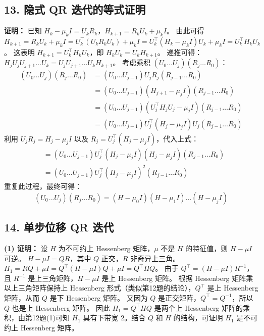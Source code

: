 \documentclass{article}
\begin{document}
\subsection*{13. 隐式 QR 迭代的等式证明}
\textbf{证明：}
已知 \(H_k - \mu_k I = U_k R_k\)，\(H_{k+1} = R_k U_k + \mu_k I\)。
由此可得 \(H_{k+1} = R_k U_k + \mu_k I = U_k^\top (U_k R_k U_k) + \mu_k I = U_k^\top (H_k - \mu_k I) U_k + \mu_k I = U_k^\top H_k U_k\)。
这表明 \(H_{k+1} = U_k^\top H_k U_k\)，即 \(H_k U_k = U_k H_{k+1}\)。
递推可得：\(H_j U_j U_{j+1} \dots U_k = U_j U_{j+1} \dots U_k H_{k+1}\)。
考虑乘积 \((U_0 \dots U_j)(R_j \dots R_0)\)：
\begin{align*}
    (U_0 \dots U_j)(R_j \dots R_0) &= (U_0 \dots U_{j-1}) U_j R_j (R_{j-1} \dots R_0) \\
    &= (U_0 \dots U_{j-1}) (H_{j+1} - \mu_j I) (R_{j-1} \dots R_0) \\
    &= (U_0 \dots U_{j-1}) (U_j^\top H_j U_j - \mu_j I) (R_{j-1} \dots R_0) \\
    &= (U_0 \dots U_{j-1}) U_j^\top (H_j - \mu_j I) U_j (R_{j-1} \dots R_0)
\end{align*}
利用 \(U_j R_j = H_j - \mu_j I\) 以及 \(R_j = U_j^\top (H_j - \mu_j I)\)，代入上式：
\begin{align*}
    &= (U_0 \dots U_{j-1}) U_j^\top (H_j - \mu_j I) (H_j - \mu_j I) (R_{j-1} \dots R_0) \\
    &= (U_0 \dots U_{j-1}) U_j^\top (H_j - \mu_j I)^2 (R_{j-1} \dots R_0)
\end{align*}
重复此过程，最终可得：
\[
 (U_0 \dots U_j)(R_j \dots R_0) = (H - \mu_0 I)(H - \mu_1 I) \dots (H - \mu_j I) 
\]

\subsection*{14. 单步位移 QR 迭代}
\textbf{(1) 证明：}
设 \(H\) 为不可约上 Hessenberg 矩阵，\(\mu\) 不是 \(H\) 的特征值，则 \(H - \mu I\) 可逆。
\(H - \mu I = QR\)，其中 \(Q\) 正交，\(R\) 非奇异上三角。
\(H_1 = RQ + \mu I = Q^\top (H - \mu I) Q + \mu I = Q^\top H Q\)。
由于 \(Q^\top = (H - \mu I) R^{-1}\)，且 \(R^{-1}\) 是上三角矩阵，\(H - \mu I\) 是上 Hessenberg 矩阵。
根据 Hessenberg 矩阵乘以上三角矩阵保持上 Hessenberg 形式（类似第12题的结论），\(Q^\top\) 是上 Hessenberg 矩阵，从而 \(Q\) 是下 Hessenberg 矩阵。
又因为 \(Q\) 是正交矩阵，\(Q^\top = Q^{-1}\)，所以 \(Q\) 也是上 Hessenberg 矩阵。
因此 \(H_1 = Q^\top H Q\) 是两个上 Hessenberg 矩阵的乘积，由第12题(1)可知 \(H_1\) 具有下带宽 2。结合 \(Q\) 和 \(H\) 的结构，可证明 \(H_1\) 是不可约上 Hessenberg 矩阵。
\end{document}
